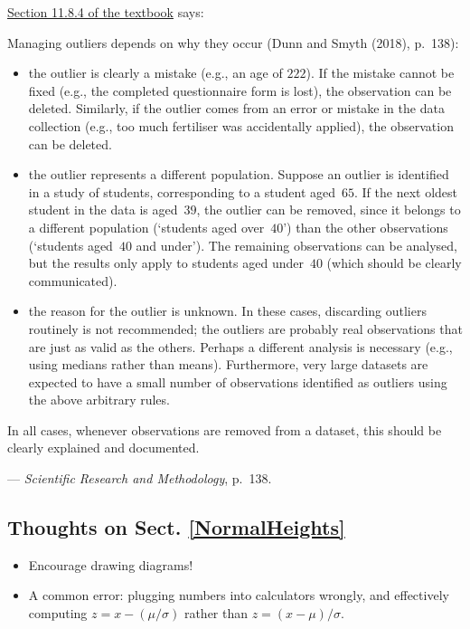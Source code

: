 \documentclass[
  11pt,
  a4paper,
  krantz2]{krantz}
\makeatletter
\providecommand{\tightlist}{%
  \setlength{\itemsep}{0pt}\setlength{\parskip}{0pt}}
\renewenvironment{quote}%
{\begin{kframe}}
{\end{kframe}}
\newenvironment{kframe}{%
\medskip{}
\setlength{\fboxsep}{.8em}
 \def\at@end@of@kframe{}%
 \ifinner\ifhmode%
  \def\at@end@of@kframe{\end{minipage}}%
  \begin{minipage}{\columnwidth}%
 \fi\fi%
 \def\FrameCommand##1{\hskip\@totalleftmargin \hskip-\fboxsep
 \colorbox{shadecolor}{##1}\hskip-\fboxsep
     \hskip-\linewidth \hskip-\@totalleftmargin \hskip\columnwidth}%
 \MakeFramed {\advance\hsize-\width
   \@totalleftmargin\z@ \linewidth\hsize
   \@setminipage}}%
 {\par\unskip\endMakeFramed%
 \at@end@of@kframe}
\renewenvironment{quote}
               {\list{}{\vspace{-0.5em}\begin{kframe}\small%
                        \rightmargin   \leftmargin
                        \parsep        \z@ \@plus\p@}%
                \item\relax}
               {\end{kframe}\endlist}
\makeatother
\begin{document}
\href{https://bookdown.org/pkaldunn/SRM-Textbook/SummariseQuantData.html?q=outliers\#SummaryOutliers}{Section 11.8.4 of the textbook} says:

\begin{quote}
Managing outliers depends on why they occur (Dunn and Smyth (2018), p.~138):

\begin{itemize}
\tightlist
\item
  the outlier is clearly a mistake (e.g., an age of \(222\)).
  If the mistake cannot be fixed (e.g., the completed questionnaire form is lost), the observation can be deleted.
  Similarly, if the outlier comes from an error or mistake in the data collection (e.g., too much fertiliser was accidentally applied), the observation can be deleted.
\item
  the outlier represents a different population.
  Suppose an outlier is identified in a study of students, corresponding to a student aged~\(65\).
  If the next oldest student in the data is aged~\(39\), the outlier can be removed, since it belongs to a different population (`students aged over~\(40\)') than the other observations (`students aged~\(40\) and under').
  The remaining observations can be analysed, but the results only apply to students aged under~\(40\) (which should be clearly communicated).
\item
  the reason for the outlier is unknown.
  In these cases, discarding outliers routinely is not recommended; the outliers are probably real observations that are just as valid as the others.
  Perhaps a different analysis is necessary (e.g., using medians rather than means).
  Furthermore, very large datasets are expected to have a small number of observations identified as outliers using the above arbitrary rules.
\end{itemize}

In all cases, whenever observations are removed from a dataset, this should be clearly explained and documented.

--- \emph{Scientific Research and Methodology}, p.~138.
\end{quote}

\subsection{Thoughts on Sect. \ref{NormalHeights}}\label{thoughts-on-sect.-refnormalheights}

\begin{itemize}
\tightlist
\item
  Encourage drawing diagrams!
\item
  A common error: plugging numbers into calculators wrongly, and effectively computing \(z = x - (\mu/\sigma)\) rather than \(z = (x - \mu)/\sigma\).
\end{itemize}
\end{document}
